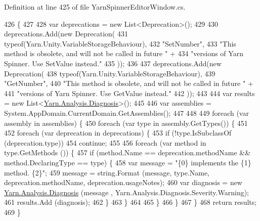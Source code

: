 Definition at line 425 of file Yarn\-Spinner\-Editor\-Window.\-cs.


\begin{DoxyCode}
426         \{
427 
428             var deprecations = \textcolor{keyword}{new} List<Deprecation>();
429 
430             deprecations.Add(\textcolor{keyword}{new} Deprecation(
431                 typeof(Yarn.Unity.VariableStorageBehaviour),
432                 \textcolor{stringliteral}{"SetNumber"},
433                 \textcolor{stringliteral}{"This method is obsolete, and will not be called in future "} +
434                 \textcolor{stringliteral}{"versions of Yarn Spinner. Use SetValue instead."}
435             ));
436 
437             deprecations.Add(\textcolor{keyword}{new} Deprecation(
438                 typeof(Yarn.Unity.VariableStorageBehaviour),
439                 \textcolor{stringliteral}{"GetNumber"},
440                 \textcolor{stringliteral}{"This method is obsolete, and will not be called in future "} +
441                 \textcolor{stringliteral}{"versions of Yarn Spinner. Use GetValue instead."}
442             ));
443 
444             var results = \textcolor{keyword}{new} List<\hyperlink{a00087}{Yarn.Analysis.Diagnosis}>();
445 
446             var assemblies = System.AppDomain.CurrentDomain.GetAssemblies();
447 
448 
449             \textcolor{keywordflow}{foreach} (var assembly \textcolor{keywordflow}{in} assemblies) \{
450                 \textcolor{keywordflow}{foreach} (var type \textcolor{keywordflow}{in} assembly.GetTypes()) \{
451 
452                     \textcolor{keywordflow}{foreach} (var deprecation \textcolor{keywordflow}{in} deprecations) \{
453                         \textcolor{keywordflow}{if} (!type.IsSubclassOf (deprecation.type))
454                             \textcolor{keywordflow}{continue};
455 
456                         \textcolor{keywordflow}{foreach} (var method \textcolor{keywordflow}{in} type.GetMethods ()) \{
457                             \textcolor{keywordflow}{if} (method.Name == deprecation.methodName && method.DeclaringType == type) \{
458                                 var message = \textcolor{stringliteral}{"\{0\} implements the \{1\} method. \{2\}"};
459                                 message = string.Format (message, type.Name, deprecation.methodName, 
      deprecation.usageNotes);
460                                 var diagnosis = \textcolor{keyword}{new} \hyperlink{a00087}{Yarn.Analysis.Diagnosis} (message
      , Yarn.Analysis.Diagnosis.Severity.Warning);
461                                 results.Add (diagnosis);
462                             \}
463                         \}
464 
465                     \}
466                 \}
467             \}
468             \textcolor{keywordflow}{return} results;
469         \}
\end{DoxyCode}
